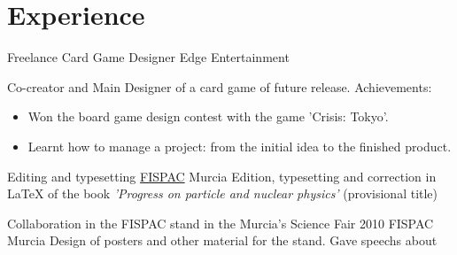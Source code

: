 \documentclass[11pt,a4paper,roman]{moderncv}
\begin{document}




\section{Experience}

	{Freelance Card Game Designer}
	{Edge Entertainment}
	{}
	{}
	{Co-creator and Main Designer of a card game of future release.\newline{}
Achievements:
\begin{itemize}
	\item Won the board game design contest with the game 'Crisis: Tokyo'.
	\item Learnt how to manage a project: from the initial idea to the finished product.
\end{itemize}}

	{Editing and typesetting}
	{\href{http://www.um.es/fispac/}{FISPAC}}
	{Murcia}
	{}
	{Edition, typesetting and correction in \LaTeX{} of the book \textit{'Progress on particle and nuclear physics'} (provisional title)\newline{}}

	{Collaboration in the FISPAC stand in the Murcia's Science Fair 2010}
	{FISPAC}
	{Murcia}
	{}
	{Design of posters and other material for the stand. Gave speechs about}

\end{document}
